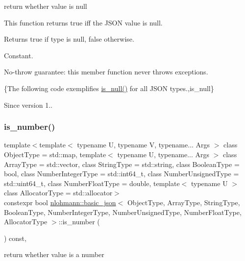 return whether value is null 

This function returns true iff the J\+S\+ON value is null.

\begin{DoxyReturn}{Returns}
{\ttfamily true} if type is null, {\ttfamily false} otherwise.
\end{DoxyReturn}
Constant.

No-\/throw guarantee\+: this member function never throws exceptions.

\{The following code exemplifies {\ttfamily \hyperlink{classnlohmann_1_1basic__json_a8abdfc0d6e051f6fa29d49da57bce631}{is\+\_\+null()}} for all J\+S\+ON types.,is\+\_\+null\}

\begin{DoxySince}{Since}
version 1.. 
\end{DoxySince}
\hypertarget{classnlohmann_1_1basic__json_a957eb9594c7f0ca93212c30f3a400873}{}\label{classnlohmann_1_1basic__json_a957eb9594c7f0ca93212c30f3a400873} 
\subsubsection{\texorpdfstring{is\+\_\+number()}{is\_number()}}
{\footnotesize\ttfamily template$<$template$<$ typename U, typename V, typename... Args $>$ class Object\+Type = std\+::map, template$<$ typename U, typename... Args $>$ class Array\+Type = std\+::vector, class String\+Type  = std\+::string, class Boolean\+Type  = bool, class Number\+Integer\+Type  = std\+::int64\+\_\+t, class Number\+Unsigned\+Type  = std\+::uint64\+\_\+t, class Number\+Float\+Type  = double, template$<$ typename U $>$ class Allocator\+Type = std\+::allocator$>$ \\
constexpr bool \hyperlink{classnlohmann_1_1basic__json}{nlohmann\+::basic\+\_\+json}$<$ Object\+Type, Array\+Type, String\+Type, Boolean\+Type, Number\+Integer\+Type, Number\+Unsigned\+Type, Number\+Float\+Type, Allocator\+Type $>$\+::is\+\_\+number (\begin{DoxyParamCaption}{ }\end{DoxyParamCaption}) const\hspace{0.3cm}{\ttfamily [inline]}, {\ttfamily [noexcept]}}



return whether value is a number 

